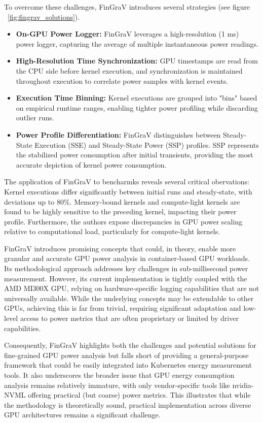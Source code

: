 To overcome these challenges, FinGraV introduces several strategies (see figure ~\ref{fig:fingrav_solutions}). 
\begin{itemize}
    \item \textbf{On-GPU Power Logger:} FinGraV leverages a high-resolution (1 ms) power logger, capturing the average of multiple instantaneous power readings.
    \item \textbf{High-Resolution Time Synchronization:} GPU timestamps are read from the CPU side before kernel execution, and synchronization is maintained throughout execution to correlate power samples with kernel events.    
    \item \textbf{Execution Time Binning:} Kernel executions are grouped into "bins" based on empirical runtime ranges, enabling tighter power profiling while discarding outlier runs.    
    \item \textbf{Power Profile Differentiation:} FinGraV distinguishes between Steady-State Execution (SSE) and Steady-State Power (SSP) profiles. SSP represents the stabilized power consumption after initial transients, providing the most accurate depiction of kernel power consumption.
\end{itemize}
The application of FinGraV to bencharmks reveals several critical obervations: Kernel executions differ significantly between initial runs and steady-state, with deviations up to 80\%. Memory-bound kernels and compute-light kernels are found to be highly sensitive to the preceding kernel, impacting their power profile. Furthermore, the authors expose discrepancies in GPU power scaling relative to computational load, particularly for compute-light kernels.

FinGraV introduces promising concepts that could, in theory, enable more granular and accurate GPU power analysis in container-based GPU workloads. Its methodological approach addresses key challenges in sub-millisecond power measurement. However, its current implementation is tightly coupled with the AMD MI300X GPU, relying on hardware-specific logging capabilities that are not universally available. While the underlying concepts may be extendable to other GPUs, achieving this is far from trivial, requiring significant adaptation and low-level access to power metrics that are often proprietary or limited by driver capabilities.

Consequently, FinGraV highlights both the challenges and potential solutions for fine-grained GPU power analysis but falls short of providing a general-purpose framework that could be easily integrated into Kubernetes energy measurement tools. It also underscores the broader issue that GPU energy consumption analysis remains relatively immature, with only vendor-specific tools like nvidia-NVML offering practical (but coarse) power metrics. This illustrates that while the methodology is theoretically sound, practical implementation across diverse GPU architectures remains a significant challenge.

